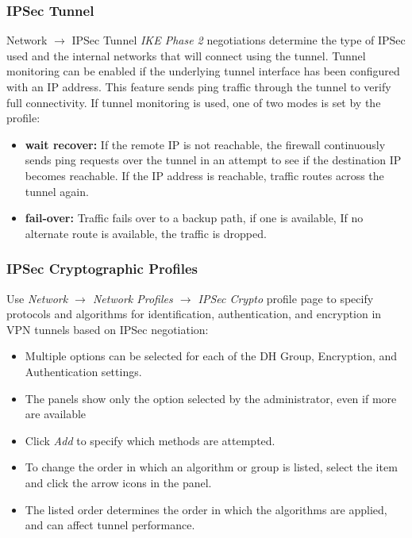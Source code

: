 \subsubsection{IPSec Tunnel}
Network $\rightarrow$ IPSec Tunnel
\newline
\textit{IKE Phase 2} negotiations determine the type of IPSec used and the internal networks that will connect using the tunnel.
Tunnel monitoring can be enabled if the underlying tunnel interface has been configured with an IP address. 
This feature sends ping traffic through the tunnel to verify full connectivity. 
If tunnel monitoring is used, one of two modes is set by the profile:
\begin{itemize}
    \item \textbf{wait recover:} If the remote IP is not reachable, the firewall continuously sends ping requests over the tunnel in an attempt to see if the destination IP becomes reachable. 
    If the IP address is reachable, traffic routes across the tunnel again.
    \item \textbf{fail-over:} Traffic fails over to a backup path, if one is available, If no alternate route is available, the traffic is dropped.
\end{itemize}

\subsubsection{IPSec Cryptographic Profiles}
Use \textit{Network $\rightarrow$ Network Profiles $\rightarrow$ IPSec Crypto} profile page to specify protocols and algorithms for identification, authentication, and encryption in VPN tunnels based on IPSec negotiation:
\begin{itemize}
    \item Multiple options can be selected for each of the DH Group, Encryption, and Authentication settings.
    \item The panels show only the option selected by the administrator, even if more are available
    \item Click \textit{Add} to specify which methods are attempted.
    \item To change the order in which an algorithm or group is listed, select the item and click the arrow icons in the panel.
    \item The listed order determines the order in which the algorithms are applied, and can affect tunnel performance.
\end{itemize}

